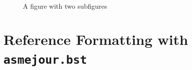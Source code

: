 \documentclass[largesc,upint,varvw,barcolor=Red4,nocopyright,hyphenate,balance,lang-second=french,lang=english]{asmejour}
\begin{document}

\begin{figure}[t]
\begin{subfigure}[t]{0.5\textwidth} %
\vbox{
\vspace*{1.7em}
\vspace*{1.7em}
}
\end{subfigure}%
\begin{subfigure}[t]{0.5\textwidth} %
\end{subfigure}%
\caption{A figure with two subfigures \cite{Lienhard2019b}\label{fig:2}}
\end{figure}


\section{Reference Formatting with \texttt{asmejour.bst}}
\end{document}
